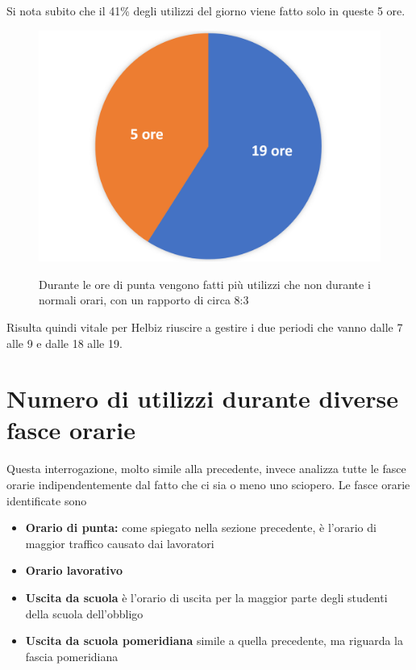 Si nota subito che il 41\% degli utilizzi del giorno viene fatto solo in queste 5 ore.
\begin{figure}[H]                                                                                                                                                            
\centering                                                                                                                                                                   
\includegraphics[width=\textwidth]{images/result5}                                                                                                                                   
\label{fig:result5} 
\caption{Durante le ore di punta vengono fatti più utilizzi che non durante i normali orari, con un rapporto di circa 8:3 }                                                                                                                                                          
\end{figure}
Risulta quindi vitale per Helbiz riuscire a gestire i due periodi che vanno dalle 7 alle 9  e dalle 18 alle 19.


\section{Numero di utilizzi durante diverse fasce orarie}
Questa interrogazione, molto simile alla precedente, invece analizza
tutte le fasce orarie indipendentemente dal fatto che ci sia o meno uno sciopero.
Le fasce orarie identificate sono
\begin{itemize}
	\item{\textbf{Orario di punta:} come spiegato nella sezione precedente, è l'orario di maggior traffico causato dai lavoratori}
	\item{\textbf{Orario lavorativo}}
	\item{\textbf{Uscita da scuola} è l'orario di uscita per la maggior parte degli studenti della scuola dell'obbligo}
	\item{\textbf{Uscita da scuola pomeridiana} simile a quella precedente, ma riguarda la fascia pomeridiana}
\end{itemize}

